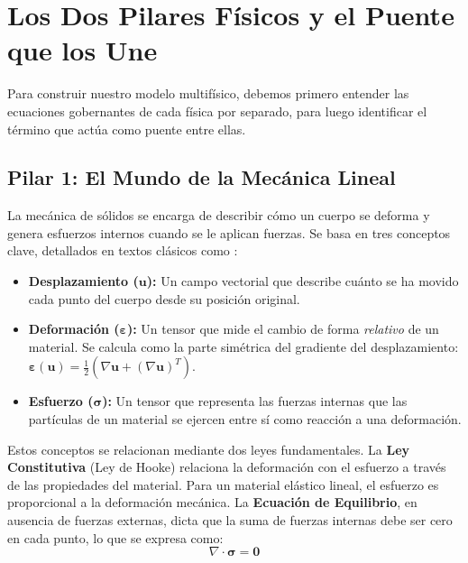 \section{Los Dos Pilares Físicos y el Puente que los Une}
\label{sec:thermo-theory}
Para construir nuestro modelo multifísico, debemos primero entender las ecuaciones gobernantes de cada física por separado, para luego identificar el término que actúa como puente entre ellas.

\subsection{Pilar 1: El Mundo de la Mecánica Lineal}
La mecánica de sólidos se encarga de describir cómo un cuerpo se deforma y genera esfuerzos internos cuando se le aplican fuerzas. Se basa en tres conceptos clave, detallados en textos clásicos como \cite{Belytschko2014}:
\begin{itemize}
    \item \textbf{Desplazamiento (\(\bm{u}\)):} Un campo vectorial que describe cuánto se ha movido cada punto del cuerpo desde su posición original.
    \item \textbf{Deformación (\(\bm{\varepsilon}\)):} Un tensor que mide el cambio de forma \textit{relativo} de un material. Se calcula como la parte simétrica del gradiente del desplazamiento: \(\bm{\varepsilon}(\bm{u}) = \frac{1}{2}(\nabla\bm{u} + (\nabla\bm{u})^T)\).
    \item \textbf{Esfuerzo (\(\bm{\sigma}\)):} Un tensor que representa las fuerzas internas que las partículas de un material se ejercen entre sí como reacción a una deformación.
\end{itemize}
Estos conceptos se relacionan mediante dos leyes fundamentales. La \textbf{Ley Constitutiva} (Ley de Hooke) relaciona la deformación con el esfuerzo a través de las propiedades del material. Para un material elástico lineal, el esfuerzo es proporcional a la deformación mecánica. La \textbf{Ecuación de Equilibrio}, en ausencia de fuerzas externas, dicta que la suma de fuerzas internas debe ser cero en cada punto, lo que se expresa como:
\begin{equation}
    \nabla \cdot \bm{\sigma} = \bm{0}
    \label{eq:equilibrium}
\end{equation}

